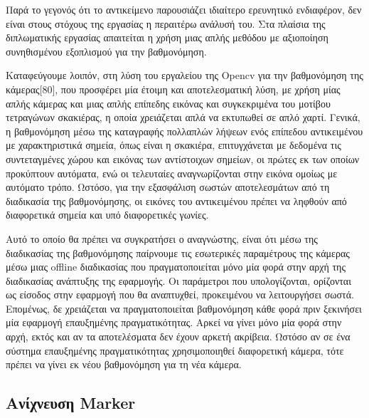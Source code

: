  Παρά το γεγονός ότι το αντικείμενο παρουσιάζει ιδιαίτερο ερευνητικό ενδιαφέρον, δεν είναι στους στόχους της εργασίας η περαιτέρω ανάλυσή του. Στα πλαίσια της διπλωματικής εργασίας απαιτείται η χρήση μιας απλής μεθόδου με αξιοποίηση συνηθισμένου εξοπλισμού για την βαθμονόμηση. 


Καταφεύγουμε λοιπόν, στη λύση του εργαλείου της Opencv για την βαθμονόμηση της κάμερας[80], που προσφέρει μία έτοιμη και αποτελεσματική λύση, με χρήση μίας απλής κάμερας και μιας απλής επίπεδης εικόνας και συγκεκριμένα του μοτίβου τετραγώνων σκακιέρας, η οποία χρειάζεται απλά να εκτυπωθεί σε απλό χαρτί. 
Γενικά, η βαθμονόμηση μέσω της καταγραφής πολλαπλών λήψεων ενός επίπεδου αντικειμένου με χαρακτηριστικά σημεία, όπως είναι η σκακιέρα, επιτυγχάνεται με δεδομένα τις συντεταγμένες χώρου και εικόνας των αντίστοιχων σημείων, οι πρώτες εκ των οποίων προκύπτουν αυτόματα, ενώ οι τελευταίες αναγνωρίζονται στην εικόνα ομοίως με αυτόματο τρόπο. Ωστόσο, για την εξασφάλιση σωστών αποτελεσμάτων από τη διαδικασία της βαθμονόμησης, οι εικόνες του αντικειμένου πρέπει να ληφθούν από διαφορετικά σημεία και υπό διαφορετικές γωνίες. 




Αυτό το οποίο θα πρέπει να συγκρατήσει ο αναγνώστης, είναι ότι μέσω της διαδικασίας της βαθμονόμησης παίρνουμε τις εσωτερικές παραμέτρους της κάμερας μέσω μιας offline διαδικασίας που πραγματοποιείται μόνο μία φορά στην αρχή της διαδικασίας ανάπτυξης της εφαρμογής. Οι παράμετροι που υπολογίζονται, ορίζονται ως είσοδος στην εφαρμογή που θα αναπτυχθεί, προκειμένου να λειτουργήσει σωστά. Επομένως, δε χρειάζεται να πραγματοποιείται βαθμονόμηση κάθε φορά πριν ξεκινήσει μία εφαρμογή επαυξημένης πραγματικότητας. Αρκεί να γίνει μόνο μία φορά στην αρχή, εκτός και αν τα αποτελέσματα δεν έχουν αρκετή ακρίβεια. Ωστόσο αν σε ένα σύστημα επαυξημένης πραγματικότητας χρησιμοποιηθεί διαφορετική κάμερα, τότε πρέπει να γίνει εκ νέου βαθμονόμηση για τη νέα κάμερα.






\subsection{Ανίχνευση Marker}



